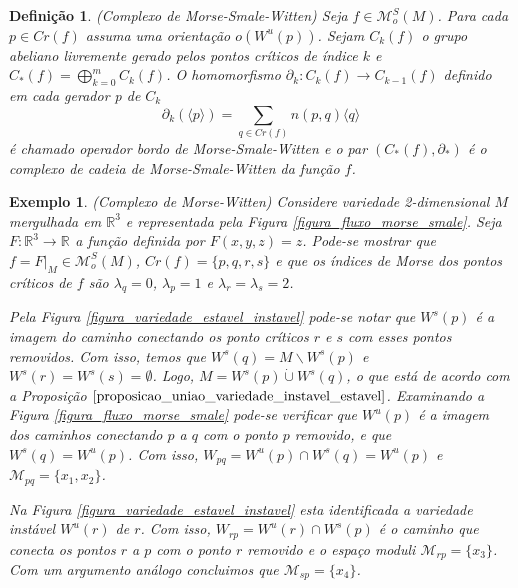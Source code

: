 \documentclass[12pt]{book}
\newtheorem{definicao}[teorema]{Definição}
\newtheorem{exemplo}[teorema]{Exemplo}
\newcommand{\complementar}[2]{#1 \backslash #2}
\newcommand{\espacomoduli}[2]{\mathcal{M}_{#1#2}}
\newcommand{\funcoesmorsesmale}[1]{\mathcal{M}^{S}_{o}(#1)}
\newcommand{\gerador}[1]{\langle #1\rangle}
\newcommand{\pontoscriticos}[1]{\textit{Cr}(#1)}
\newcommand{\real}[1]{\mathbb{R}^{#1}}
\newcommand{\reta}{\real{}}
\newcommand{\variedadeconectantepontos}[2]{W_{#1#2}}
\newcommand{\variedadeestavel}[1]{W^{s}(#1)}
\newcommand{\variedadeinstavel}[1]{W^{u}(#1)}
\begin{document}
	\begin{definicao}
		(Complexo de Morse-Smale-Witten) Seja $f \in \funcoesmorsesmale{M}$. Para cada $p \in \pontoscriticos{f}$ assuma uma orientação $o(\variedadeinstavel{p})$. Sejam $C_{k}(f)$ o grupo abeliano livremente gerado pelos pontos críticos de índice $k$ e $C_{*}(f) =\bigoplus^{m}_{k=0}C_{k}(f)$. O homomorfismo $\partial_{k}: C_{k}(f)\to C_{k-1}(f)$ definido em cada gerador p de $C_{k}$
		$$
		\partial_{k}(\gerador{p})=\sum_{q \in \pontoscriticos{f}}n(p,q)\gerador{q}
		$$
		é chamado operador bordo de Morse-Smale-Witten e o par $(C_{*}(f), \partial_{*})$ é o complexo de cadeia de Morse-Smale-Witten  da função $f$.
		
	\end{definicao}
	
	\begin{exemplo}
		(Complexo de Morse-Witten) Considere variedade 2-dimensional $M$ mergulhada em $\real{3}$ e representada pela Figura \ref{figura_fluxo_morse_smale}. Seja $F:\real{3} \to \reta$ a função definida por $F(x, y, z) = z$. Pode-se mostrar que $f=F|_{M} \in \funcoesmorsesmale{M}$,  $\pontoscriticos{f} = \{p,q,r,s\}$ e que os índices de Morse dos pontos críticos de $f$ são $\lambda_{q} = 0$, $\lambda_{p} = 1$ e $\lambda_{r}=\lambda_{s} = 2$. 
		
		Pela Figura \ref{figura_variedade_estavel_instavel} pode-se notar que $\variedadeestavel{p}$ é a imagem do caminho conectando os ponto críticos $r$ e $s$ com esses pontos removidos. Com isso, temos que $\variedadeestavel{q} = \complementar{M}{\variedadeestavel{p}}$ e  $\variedadeestavel{r} = \variedadeestavel{s} = \emptyset$. Logo, $M = \variedadeestavel{p}\dot{\cup} \variedadeestavel{q}$, o que está de acordo com a Proposição $\ref{proposicao_uniao_variedade_instavel_estavel}$. Examinando a Figura \ref{figura_fluxo_morse_smale} pode-se verificar que $\variedadeinstavel{p}$ é a imagem dos caminhos conectando $p$ a $q$ com o ponto $p$ removido, e que $\variedadeestavel{q} = \variedadeinstavel{p}$. Com isso,  $\variedadeconectantepontos{p}{q} = \variedadeinstavel{p}\cap\variedadeestavel{q} = \variedadeinstavel{p}$ e $\espacomoduli{p}{q}=\{x_{1}, x_{2}\}$. 
		
		Na Figura \ref{figura_variedade_estavel_instavel} esta identificada a variedade instável $\variedadeinstavel{r}$ de $r$. Com isso, $\variedadeconectantepontos{r}{p} = \variedadeinstavel{r} \cap\variedadeestavel{p}$ é o caminho que conecta os pontos $r$ a $p$ com o ponto $r$ removido e o espaço moduli $\espacomoduli{r}{p} = \{ x_{3}\}$. Com um argumento análogo concluimos que $\espacomoduli{s}{p} = \{x_{4} \}$.
		

\end{exemplo}
\end{document}
